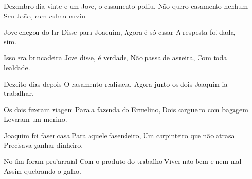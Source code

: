 \documentclass{article}
\begin{document}
\begin{poem}
	\begin{stanza}
    Dezembro dia vinte e um    \verseline
    Jove, o casamento pediu,   \verseline
    Não quero casamento nenhum \verseline
    Seu João, com calma ouviu.
  \end{stanza}
\end{poem}

\begin{poem}
	\begin{stanza}
    Jove chegou do lar  \verseline
    Disse para Joaquim, \verseline
    Agora é só casar    \verseline
    A resposta foi dada, sim.
  \end{stanza}
\end{poem}

\begin{poem}
	\begin{stanza}
    Isso era brincadeira   \verseline
    Jove disse, é verdade, \verseline
    Não passa de asneira,  \verseline
    Com toda lealdade.
  \end{stanza}
\end{poem}

\begin{poem}
	\begin{stanza}
    Dezoito dias depois    \verseline
    O casamento realisava, \verseline
    Agora junto os dois    \verseline
    Joaquim ia trabalhar.
  \end{stanza}
\end{poem}

\begin{poem}
	\begin{stanza}
    Os dois fizeram viagem      \verseline
    Para a fazenda do Ermelino, \verseline
    Dois cargueiro com bagagem  \verseline
    Levaram um menino.
  \end{stanza}
\end{poem}

\begin{poem}
	\begin{stanza}
    Joaquim foi faser casa        \verseline
    Para aquele fasendeiro,       \verseline
    Um carpinteiro que não atrasa \verseline
    Precisava ganhar dinheiro.
  \end{stanza}
\end{poem}

\begin{poem}
	\begin{stanza}
    No fim foram pru'arraial  \verseline
    Com o produto do trabalho \verseline
    Viver não bem e nem mal   \verseline
    Assim quebrando o galho.
  \end{stanza}
\end{poem}
\end{document}
